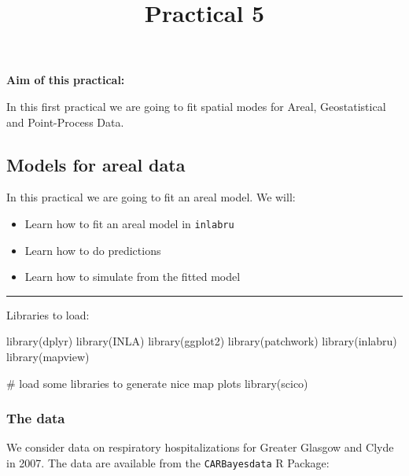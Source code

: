 \documentclass[
  letterpaper,
  DIV=11,
  numbers=noendperiod]{scrartcl}
\title{Practical 5}
\author{}
\date{}
\makeatletter
\newenvironment{Shaded}{\begin{snugshade}}{\end{snugshade}}
\newcommand{\CommentTok}[1]{\textcolor[rgb]{0.37,0.37,0.37}{#1}}
\newcommand{\FunctionTok}[1]{\textcolor[rgb]{0.28,0.35,0.67}{#1}}
\newcommand{\NormalTok}[1]{\textcolor[rgb]{0.00,0.23,0.31}{#1}}
\renewcommand{\maketitle}{\bgroup\setlength{\parindent}{0pt}
\begin{flushleft}
  {\sffamily\huge\textbf{\MakeUppercase{\@title}}} \vspace{0.3cm} \newline
  {\Large {\@subtitle}} \newline
  \@author
\end{flushleft}\egroup
}
\makeatother
\begin{document}
\maketitle

\pagestyle{mystyle}


\textbf{Aim of this practical:}

In this first practical we are going to fit spatial modes for Areal,
Geostatistical and Point-Process Data.

\subsection{Models for areal data}\label{models-for-areal-data}

In this practical we are going to fit an areal model. We will:

\begin{itemize}
\item
  Learn how to fit an areal model in \texttt{inlabru}
\item
  Learn how to do predictions
\item
  Learn how to simulate from the fitted model
\end{itemize}

\begin{center}\rule{0.5\linewidth}{0.5pt}\end{center}

Libraries to load:

\begin{Shaded}
\begin{Highlighting}[]
\FunctionTok{library}\NormalTok{(dplyr)}
\FunctionTok{library}\NormalTok{(INLA)}
\FunctionTok{library}\NormalTok{(ggplot2)}
\FunctionTok{library}\NormalTok{(patchwork)}
\FunctionTok{library}\NormalTok{(inlabru)   }
\FunctionTok{library}\NormalTok{(mapview)}

\CommentTok{\# load some libraries to generate nice map plots}
\FunctionTok{library}\NormalTok{(scico)}
\end{Highlighting}
\end{Shaded}

\subsubsection{The data}\label{the-data}

We consider data on respiratory hospitalizations for Greater Glasgow and
Clyde in 2007. The data are available from the \texttt{CARBayesdata} R
Package:
\end{document}
